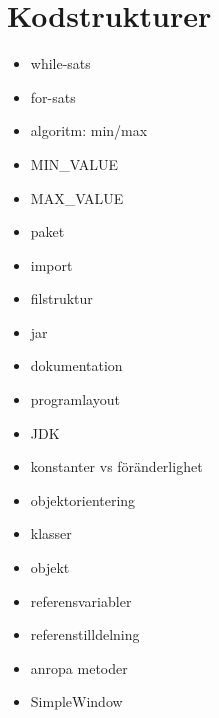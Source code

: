 \chapter{Kodstrukturer}
\begin{itemize}[nosep]
\item while-sats
\item for-sats
\item algoritm: min/max
\item MIN_VALUE
\item MAX_VALUE
\item paket
\item import
\item filstruktur
\item jar
\item dokumentation
\item programlayout
\item JDK
\item konstanter vs föränderlighet
\item objektorientering
\item klasser
\item objekt
\item referensvariabler
\item referenstilldelning
\item anropa metoder
\item SimpleWindow\end{itemize}